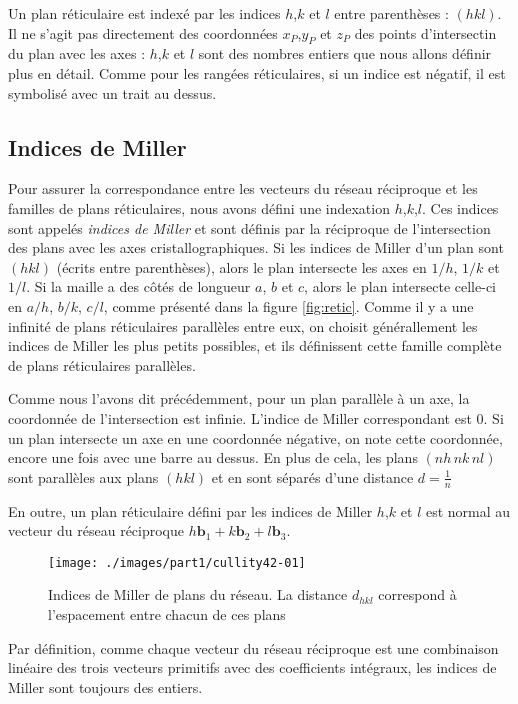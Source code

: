 Un plan réticulaire est indexé par les indices $h$,$k$ et $l$ entre parenthèses : $(hkl)$. Il ne s'agit pas directement des coordonnées $x_P$,$y_P$ et $z_P$ des points d'intersectin du plan avec les axes : $h$,$k$ et $l$ sont des nombres entiers que nous allons définir plus en détail. Comme pour les rangées réticulaires, si un indice est négatif, il est symbolisé avec un trait au dessus.

\subsection{Indices de Miller}

Pour assurer la correspondance entre les vecteurs du réseau réciproque et les familles de plans réticulaires, nous avons défini une indexation $h$,$k$,$l$. Ces indices sont appelés \emph{indices de Miller} et sont définis par la réciproque de l'intersection des plans avec les axes cristallographiques. Si les indices de Miller d'un plan sont $(hkl)$ (écrits entre parenthèses), alors le plan intersecte les axes en $1/h$, $1/k$ et $1/l$. Si la maille a des côtés de longueur $a$, $b$ et $c$, alors le plan intersecte celle-ci en $a/h$, $b/k$, $c/l$, comme présenté dans la figure \ref{fig:retic}. Comme il y a une infinité de plans réticulaires parallèles entre eux, on choisit générallement les indices de Miller les plus petits possibles, et ils définissent cette famille complète de plans réticulaires parallèles.

Comme nous l'avons dit précédemment, pour un plan parallèle à un axe, la coordonnée de l'intersection est infinie. L'indice de Miller correspondant est $0$. Si un plan intersecte un axe en une coordonnée négative, on note cette coordonnée, encore une fois avec une barre au dessus.
En plus de cela, les plans $(nh\,nk\,nl)$ sont parallèles aux plans $(hkl)$ et en sont séparés d'une distance $d = \frac{1}{n}$

En outre, un plan réticulaire défini par les indices de Miller $h$,$k$ et $l$ est normal au vecteur du réseau réciproque $h\mathbf{b}_1 + k \mathbf{b}_2 + l\mathbf{b}_3$. 

\begin{figure}
    \texttt{[image: ./images/part1/cullity42-01]}
    \caption{Indices de Miller de plans du réseau. La distance $d_{hkl}$
    correspond à l'espacement entre chacun de ces plans}
    \label{fig:miller}
\end{figure}

Par définition, comme chaque vecteur du réseau réciproque est une combinaison linéaire des trois vecteurs primitifs avec des coefficients intégraux, les indices de Miller sont toujours des entiers.



